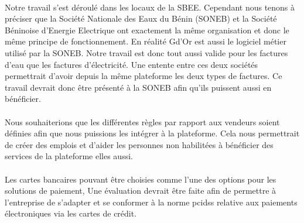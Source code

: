     \paragraph{}
	Notre travail s'est d\'eroul\'e dans les locaux de la SBEE. Cependant nous tenons \`a pr\'eciser que la Soci\'et\'e Nationale des Eaux du B\'enin (SONEB) et la Soci\'et\'e B\'eninoise d'Energie Electrique ont exactement la m\^eme organisation et donc le m\^eme principe de fonctionnement. En r\'ealit\'e Gd'Or est aussi le logiciel m\'etier utilis\'e par la SONEB. Notre travail est donc tout aussi valide pour les factures d'eau  que les factures d'\'electricit\'e. Une entente entre ces deux soci\'et\'es permettrait d'avoir depuis la m\^eme plateforme les deux types de factures. Ce travail devrait donc \^etre pr\'esent\'e \`a la SONEB afin qu'ils puissent aussi en b\'en\'eficier.

    \paragraph{}
	Nous souhaiterions que les diff\'erentes r\`egles par rapport aux vendeurs soient d\'efinies afin que nous puissions les int\'egrer \`a la plateforme. Cela nous permettrait de cr\'eer des emplois et d'aider les personnes non habilit\'ees \`a b\'en\'eficier des services de la plateforme elles aussi.

    \paragraph{}
	Les cartes bancaires pouvant \^etre choisies comme l'une des options pour les solutions de paiement, Une \'evaluation devrait \^etre faite afin de permettre \`a l'entreprise de  s'adapter et se conformer \`a la norme \gls{pcidss} relative aux paiements \'electroniques via les cartes de cr\'edit.
